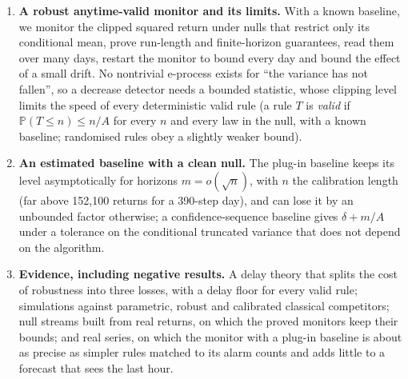\documentclass[
]{article}
\providecommand{\tightlist}{%
  \setlength{\itemsep}{0pt}\setlength{\parskip}{0pt}}
\begin{document}
\begin{enumerate}
\def\labelenumi{\arabic{enumi}.}
\tightlist
\item
  \textbf{A robust anytime-valid monitor and its limits.} With a known
  baseline, we monitor the clipped squared return under nulls that
  restrict only its conditional mean, prove run-length and
  finite-horizon guarantees, read them over many days, restart the
  monitor to bound every day and bound the effect of a small drift. No
  nontrivial e-process exists for ``the variance has not fallen'', so a
  decrease detector needs a bounded statistic, whose clipping level
  limits the speed of every deterministic valid rule (a rule \(T\) is
  \emph{valid} if \(\mathbb{P}(T \le n) \le n/A\) for every \(n\) and
  every law in the null, with a known baseline; randomised rules obey a
  slightly weaker bound).
\item
  \textbf{An estimated baseline with a clean null.} The plug-in baseline
  keeps its level asymptotically for horizons \(m = o(\sqrt n)\), with
  \(n\) the calibration length (far above 152,100 returns for a 390-step
  day), and can lose it by an unbounded factor otherwise; a
  confidence-sequence baseline gives \(\delta + m/A\) under a tolerance
  on the conditional truncated variance that does not depend on the
  algorithm.
\item
  \textbf{Evidence, including negative results.} A delay theory that
  splits the cost of robustness into three losses, with a delay floor
  for every valid rule; simulations against parametric, robust and
  calibrated classical competitors; null streams built from real
  returns, on which the proved monitors keep their bounds; and real
  series, on which the monitor with a plug-in baseline is about as
  precise as simpler rules matched to its alarm counts and adds little
  to a forecast that sees the last hour.
\end{enumerate}
\end{document}
